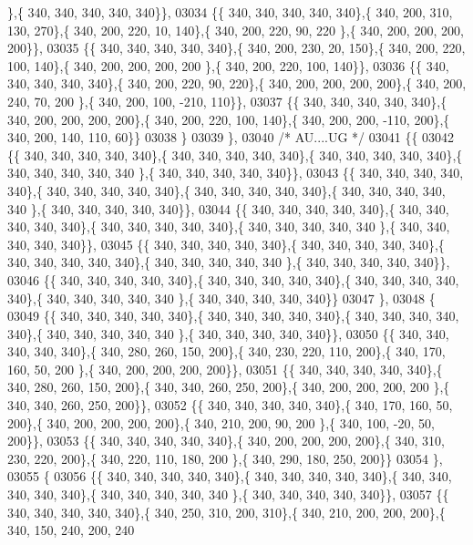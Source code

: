 \begin{DoxyCode}
      \},\{ 340, 340, 340, 340, 340\}\},
03034 \{\{ 340, 340, 340, 340, 340\},\{ 340, 200, 310, 130, 270\},\{ 340, 200, 220,  10, 140\},\{ 340, 200, 220,  90, 220
      \},\{ 340, 200, 200, 200, 200\}\},
03035 \{\{ 340, 340, 340, 340, 340\},\{ 340, 200, 230,  20, 150\},\{ 340, 200, 220, 100, 140\},\{ 340, 200, 200, 200, 200
      \},\{ 340, 200, 220, 100, 140\}\},
03036 \{\{ 340, 340, 340, 340, 340\},\{ 340, 200, 220,  90, 220\},\{ 340, 200, 200, 200, 200\},\{ 340, 200, 240,  70, 200
      \},\{ 340, 200, 100, -210, 110\}\},
03037 \{\{ 340, 340, 340, 340, 340\},\{ 340, 200, 200, 200, 200\},\{ 340, 200, 220, 100, 140\},\{ 340, 200, 200, -110, 
      200\},\{ 340, 200, 140, 110,  60\}\}
03038 \}
03039 \},
03040 \textcolor{comment}{/* AU....UG */}
03041 \{\{
03042 \{\{ 340, 340, 340, 340, 340\},\{ 340, 340, 340, 340, 340\},\{ 340, 340, 340, 340, 340\},\{ 340, 340, 340, 340, 340
      \},\{ 340, 340, 340, 340, 340\}\},
03043 \{\{ 340, 340, 340, 340, 340\},\{ 340, 340, 340, 340, 340\},\{ 340, 340, 340, 340, 340\},\{ 340, 340, 340, 340, 340
      \},\{ 340, 340, 340, 340, 340\}\},
03044 \{\{ 340, 340, 340, 340, 340\},\{ 340, 340, 340, 340, 340\},\{ 340, 340, 340, 340, 340\},\{ 340, 340, 340, 340, 340
      \},\{ 340, 340, 340, 340, 340\}\},
03045 \{\{ 340, 340, 340, 340, 340\},\{ 340, 340, 340, 340, 340\},\{ 340, 340, 340, 340, 340\},\{ 340, 340, 340, 340, 340
      \},\{ 340, 340, 340, 340, 340\}\},
03046 \{\{ 340, 340, 340, 340, 340\},\{ 340, 340, 340, 340, 340\},\{ 340, 340, 340, 340, 340\},\{ 340, 340, 340, 340, 340
      \},\{ 340, 340, 340, 340, 340\}\}
03047 \},
03048 \{
03049 \{\{ 340, 340, 340, 340, 340\},\{ 340, 340, 340, 340, 340\},\{ 340, 340, 340, 340, 340\},\{ 340, 340, 340, 340, 340
      \},\{ 340, 340, 340, 340, 340\}\},
03050 \{\{ 340, 340, 340, 340, 340\},\{ 340, 280, 260, 150, 200\},\{ 340, 230, 220, 110, 200\},\{ 340, 170, 160,  50, 200
      \},\{ 340, 200, 200, 200, 200\}\},
03051 \{\{ 340, 340, 340, 340, 340\},\{ 340, 280, 260, 150, 200\},\{ 340, 340, 260, 250, 200\},\{ 340, 200, 200, 200, 200
      \},\{ 340, 340, 260, 250, 200\}\},
03052 \{\{ 340, 340, 340, 340, 340\},\{ 340, 170, 160,  50, 200\},\{ 340, 200, 200, 200, 200\},\{ 340, 210, 200,  90, 200
      \},\{ 340, 100, -20,  50, 200\}\},
03053 \{\{ 340, 340, 340, 340, 340\},\{ 340, 200, 200, 200, 200\},\{ 340, 310, 230, 220, 200\},\{ 340, 220, 110, 180, 200
      \},\{ 340, 290, 180, 250, 200\}\}
03054 \},
03055 \{
03056 \{\{ 340, 340, 340, 340, 340\},\{ 340, 340, 340, 340, 340\},\{ 340, 340, 340, 340, 340\},\{ 340, 340, 340, 340, 340
      \},\{ 340, 340, 340, 340, 340\}\},
03057 \{\{ 340, 340, 340, 340, 340\},\{ 340, 250, 310, 200, 310\},\{ 340, 210, 200, 200, 200\},\{ 340, 150, 240, 200, 240

\end{DoxyCode}
